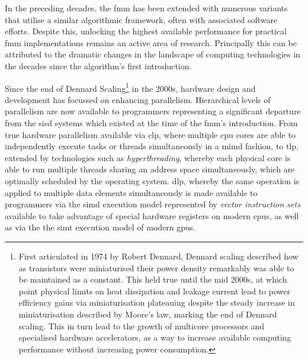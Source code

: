 In the preceding decades, the \acrshort{fmm} has been extended with numerous variants that utilise a similar algorithmic framework, often with associated software efforts. Despite this, unlocking the highest available performance for practical \acrshort{fmm} implementations remains an active area of research. Principally this can be attributed to the dramatic changes in the landscape of computing technologies in the decades since the algorithm's first introduction.

Since the end of Dennard Scaling\footnote{First articulated in 1974 by Robert Dennard, Dennard scaling described how as transistors were miniaturised their power density remarkably was able to be maintained as a constant. This held true until the mid 2000s, at which point physical limits on heat dissipation and leakage current lead to power efficiency gains via miniaturisation plateauing despite the steady increase in miniaturisation described by Moore's law, marking the end of Dennard scaling. This in turn lead to the growth of multicore processors and specialised hardware accelerators, as a way to increase available computing performance without increasing power consumption.} in the 2000s, hardware design and development has focussed on enhancing parallelism. Hierarchical levels of parallelism are now available to programmers representing a significant departure from the \acrfull{sisd} systems which existed at the time of the \acrshort{fmm}'s introduction. From true hardware parallelism available via \acrfull{clp}, where multiple \acrfull{cpu} cores are able to independently execute tasks or threads simultaneously in a \acrfull{mimd} fashion, to \acrfull{tlp}, extended by technologies such as \textit{hyperthreading}, whereby each physical core is able to run multiple threads sharing an address space simultaneously, which are optimally scheduled by the operating system. \acrfull{dlp}, whereby the same operation is applied to multiple data elements simultaneously is made available to programmers via the \acrfull{simd} execution model represented by \textit{vector instruction sets} available to take advantage of special hardware registers on modern \glspl{cpu}, as well as via the the \acrfull{simt} execution model of modern \glspl{gpu}.


